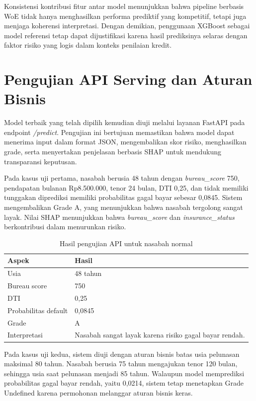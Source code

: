 Konsistensi kontribusi fitur antar model menunjukkan bahwa pipeline berbasis WoE tidak hanya menghasilkan performa prediktif yang kompetitif, tetapi juga menjaga koherensi interpretasi. Dengan demikian, penggunaan XGBoost sebagai model referensi tetap dapat dijustifikasi karena hasil prediksinya selaras dengan faktor risiko yang logis dalam konteks penilaian kredit.

\section{Pengujian API Serving dan Aturan Bisnis}
\label{sec:bab4_api_serving}
Model terbaik yang telah dipilih kemudian diuji melalui layanan FastAPI pada endpoint \textit{/predict}. Pengujian ini bertujuan memastikan bahwa model dapat menerima input dalam format JSON, mengembalikan skor risiko, menghasilkan grade, serta menyertakan penjelasan berbasis SHAP untuk mendukung transparansi keputusan.

Pada kasus uji pertama, nasabah berusia 48 tahun dengan \textit{bureau\_score} 750, pendapatan bulanan Rp8.500.000, tenor 24 bulan, DTI 0,25, dan tidak memiliki tunggakan diprediksi memiliki probabilitas gagal bayar sebesar 0,0845. Sistem mengembalikan Grade A, yang menunjukkan bahwa nasabah tergolong sangat layak. Nilai SHAP menunjukkan bahwa \textit{bureau\_score} dan \textit{insurance\_status} berkontribusi dalam menurunkan risiko.

\begin{table}[H]
\centering
\caption{Hasil pengujian API untuk nasabah normal}
\label{tab:bab4_api_normal}
\begin{tabular}{|l|l|}
\hline
\textbf{Aspek} & \textbf{Hasil} \\
\hline
Usia & 48 tahun \\
\hline
Bureau score & 750 \\
\hline
DTI & 0,25 \\
\hline
Probabilitas default & 0,0845 \\
\hline
Grade & A \\
\hline
Interpretasi & Nasabah sangat layak karena risiko gagal bayar rendah. \\
\hline
\end{tabular}
\end{table}

Pada kasus uji kedua, sistem diuji dengan aturan bisnis batas usia pelunasan maksimal 80 tahun. Nasabah berusia 75 tahun mengajukan tenor 120 bulan, sehingga usia saat pelunasan menjadi 85 tahun. Walaupun model memprediksi probabilitas gagal bayar rendah, yaitu 0,0214, sistem tetap menetapkan Grade Undefined karena permohonan melanggar aturan bisnis keras.

